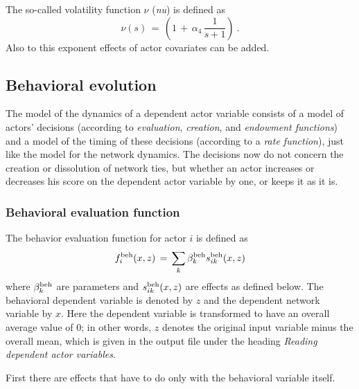 \documentclass[a4paper,fleqn,11pt]{article}
\newcommand{\+}{\, + \,}
\begin{document}
The so-called volatility function $\nu$ (\emph{nu}) is defined as
\[ \nu(s) \,=\, \left( 1 \,+\, \alpha_4 \, \frac{1}{s+1} \right) \ . \]
Also to this exponent effects of actor covariates can be added.
\fi

\subsection{Behavioral evolution}
\label{S_ff_b}

The model of the dynamics of a dependent actor variable
consists of a model of actors' decisions (according to {\it
evaluation}, {\it creation}, and {\it endowment functions})
and a model of the timing
of these decisions (according to a {\it rate function}),
just like the model for the network dynamics. The
decisions now do not concern the creation or dissolution of
network ties, but whether an actor increases or decreases his
score on the dependent actor variable by one, or keeps it as it
is.

\subsubsection{Behavioral evaluation function}
\label{S_f_b}

The behavior evaluation function for actor $i$ is defined as
\begin{equation}
f^{\rm beh}_i(x, z) \, = \, \sum_k \beta^{\rm beh}_k s^{\rm beh}_{ik}(x, z)
                                             \label{f_beh}
\end{equation}
where $\beta^{\rm beh}_k$ are parameters and $s^{\rm beh}_{ik}(x, z)$
are effects as defined below.
The behavioral dependent variable is denoted by $z$ and the
dependent network variable by $x$.
Here the dependent variable is transformed
to have an overall average value of 0;
in other words, $z$ denotes the original input variable
minus the overall mean, which is given in the output file under the heading
\emph{Reading dependent actor variables}.

First there are effects that have to do only
with the behavioral variable itself.
\end{document}
